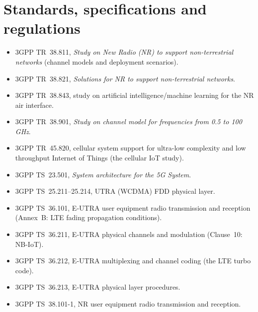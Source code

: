 \section*{Standards, specifications and regulations}
\begingroup\small
\begin{itemize}[leftmargin=1.5em,itemindent=-1.5em,itemsep=1.5pt plus 1pt,parsep=0pt,topsep=4pt,label={}]\rightskip=0pt plus 3em\relax
\item 3GPP TR~38.811, \emph{Study on New Radio (NR) to support non-terrestrial networks} (channel models and deployment scenarios).
\item 3GPP TR~38.821, \emph{Solutions for NR to support non-terrestrial networks}.
\item 3GPP TR~38.843, study on artificial intelligence/machine learning for the NR air interface.
\item 3GPP TR~38.901, \emph{Study on channel model for frequencies from 0.5 to 100\,GHz}.
\item 3GPP TR~45.820, cellular system support for ultra-low complexity and low throughput Internet of Things (the cellular IoT study).
\item 3GPP TS~23.501, \emph{System architecture for the 5G System}.
\item 3GPP TS~25.211--25.214, UTRA (WCDMA) FDD physical layer.
\item 3GPP TS~36.101, E-UTRA user equipment radio transmission and reception (Annex~B: LTE fading propagation conditions).
\item 3GPP TS~36.211, E-UTRA physical channels and modulation (Clause~10: NB-IoT).
\item 3GPP TS~36.212, E-UTRA multiplexing and channel coding (the LTE turbo code).
\item 3GPP TS~36.213, E-UTRA physical layer procedures.
\item 3GPP TS~38.101-1, NR user equipment radio transmission and reception.

\end{itemize}
